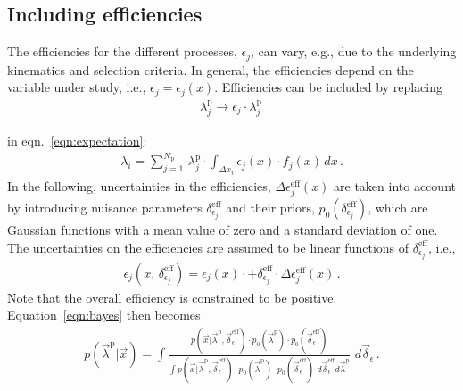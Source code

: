 \documentclass[11pt, a4paper]{article}
\begin{document}
\subsection{Including efficiencies} 

The efficiencies for the different processes, $\epsilon_{j}$, can
vary, e.g., due to the underlying kinematics and selection
criteria. In general, the efficiencies depend on the variable under
study, i.e., $\epsilon_{j}=\epsilon_{j}(x)$. Efficiencies can be
included by replacing
%
\begin{eqnarray*}
\lambda_{j}^{\mathrm{p}} \rightarrow \epsilon_{j} \cdot \lambda_{j}^{\mathrm{p}} \, 
\end{eqnarray*}

in eqn.~\ref{eqn:expectation}: 
%
\begin{eqnarray}
\lambda_{i} = \sum_{j=1}^{N_{\mathrm{p}}} \, \lambda_{j}^{\mathrm{p}} \cdot \int_{\Delta x_{i}} \epsilon_{j}(x) \cdot f_{j}(x) \, dx \, . 
\label{eqn:efficiency}
\end{eqnarray}
%
In the following, uncertainties in the efficiencies, $\Delta
\epsilon_{j}^{\mathrm{eff}}(x)$ are taken into account by introducing
nuisance parameters $\delta_{\epsilon_{j}}^{\mathrm{eff}}$ and their
priors, $p_{0}(\delta_{\epsilon_{j}}^{\mathrm{eff}})$, which are
Gaussian functions with a mean value of zero and a standard deviation
of one. The uncertainties on the efficiencies are assumed to be linear
functions of $\delta_{\epsilon_{j}}^{\mathrm{eff}}$, i.e.,
%
\begin{eqnarray*}
\epsilon_{j}(x, \, \delta_{\epsilon_{j}}^{\mathrm{eff}}) = \epsilon_{j}(x) \cdot + \delta_{\epsilon_{j}}^{\mathrm{eff}} \cdot \Delta \epsilon_{j}^{\mathrm{eff}}(x) \, .
\end{eqnarray*}
%
Note that the overall efficiency is constrained to be positive. \\

Equation~\ref{eqn:bayes} then becomes
%
\begin{eqnarray}
p(\vec{\lambda}^{\mathrm{p}}|\vec{x}) = \int \frac{p(\vec{x}|\vec{\lambda}^{\mathrm{p}},\vec{\delta}_{\epsilon}^{\mathrm{eff}}) \cdot p_{0}(\vec{\lambda}^{\mathrm{p}}) \cdot p_{0}(\vec{\delta}_{\epsilon}^{\mathrm{eff}})}{\int p(\vec{x}|\vec{\lambda}^{\mathrm{p}},\vec{\delta}_{\epsilon}^{\mathrm{eff}}) \cdot p_{0}(\vec{\lambda}^{\mathrm{p}}) \cdot p_{0}(\vec{\delta}_{\epsilon}^{\mathrm{eff}}) \, \, d\vec{\delta}_{\epsilon}^{\mathrm{eff}} d\vec{\lambda}^{\mathrm{p}}} \, \, d\vec{\delta}_{\epsilon} \, . 
\end{eqnarray}
%
\end{document}
